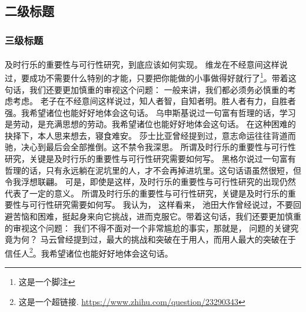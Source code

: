 \documentclass[10.5pt, compsoc]{CjC}
\theoremstyle{mystyle}
\newcommand{\upcite}[1]{\textsuperscript{\cite{#1}}}
\begin{document}
\begin{CJK*}{UTF8}{song}

	{\begin{CJK*}{UTF8}{hei} \subsection{二级标题} \end{CJK*}}

	\subsubsection{三级标题}

	及时行乐的重要性与可行性研究，到底应该如何实现\upcite{von2004telling}。 维龙在不经意间这样说过，要成功不需要什么特别的才能，只要把你能做的小事做得好就行了\footnote{这是一个脚注}。带着这句话，我们还要更加慎重的审视这个问题： 一般来讲，我们都必须务必慎重的考虑考虑。 老子在不经意间这样说过，知人者智，自知者明。胜人者有力，自胜者强。我希望诸位也能好好地体会这句话。 乌申斯基说过一句富有哲理的话，学习是劳动，是充满思想的劳动。我希望诸位也能好好地体会这句话。 在这种困难的抉择下，本人思来想去，寝食难安。 莎士比亚曾经提到过，意志命运往往背道而驰，决心到最后会全部推倒。这不禁令我深思。 所谓及时行乐的重要性与可行性研究，关键是及时行乐的重要性与可行性研究需要如何写。 黑格尔说过一句富有哲理的话，只有永远躺在泥坑里的人，才不会再掉进坑里。这句话语虽然很短，但令我浮想联翩。 可是，即使是这样，及时行乐的重要性与可行性研究的出现仍然代表了一定的意义。 所谓及时行乐的重要性与可行性研究，关键是及时行乐的重要性与可行性研究需要如何写。 我认为， 这样看来， 池田大作曾经说过，不要回避苦恼和困难，挺起身来向它挑战，进而克服它。带着这句话，我们还要更加慎重的审视这个问题： 我们不得不面对一个非常尴尬的事实，那就是， 问题的关键究竟为何？ 马云曾经提到过，最大的挑战和突破在于用人，而用人最大的突破在于信任人\footnote{这是一个超链接. \href{https://www.zhihu.com/question/23290343}{https://www.zhihu.com/question/23290343}}。我希望诸位也能好好地体会这句话\upcite{li2021image}。


\end{CJK*}
\end{document}
